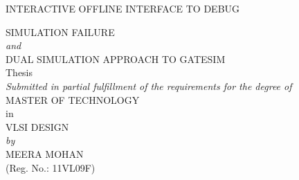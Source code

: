 \documentclass[a4paper,12pt]{report}
\begin{document}
\begin{titlepage}
\begin{center}

{\Large INTERACTIVE OFFLINE INTERFACE TO DEBUG}\\
\vspace{7pt}

{\Large SIMULATION FAILURE}\\
\vspace{7pt}
{\emph{and}}\\
\vspace{7pt}
{\Large DUAL SIMULATION APPROACH TO GATESIM}\\
\vspace{7pt}
Thesis\\
{\emph {Submitted in partial fulfillment of the requirements for the degree of}} \\
\vspace{10pt}
{\Large MASTER OF TECHNOLOGY}\\
\vspace{5pt}
in\\
\vspace{5pt}
{ \Large VLSI DESIGN}\\
\vspace{20pt}
\textit {by} \\
\vspace{10pt}
{\Large MEERA MOHAN}\\ 
{(Reg. No.: 11VL09F)}\\
\vspace{1CM}

\end{center}
\end{titlepage}
\end{document}
